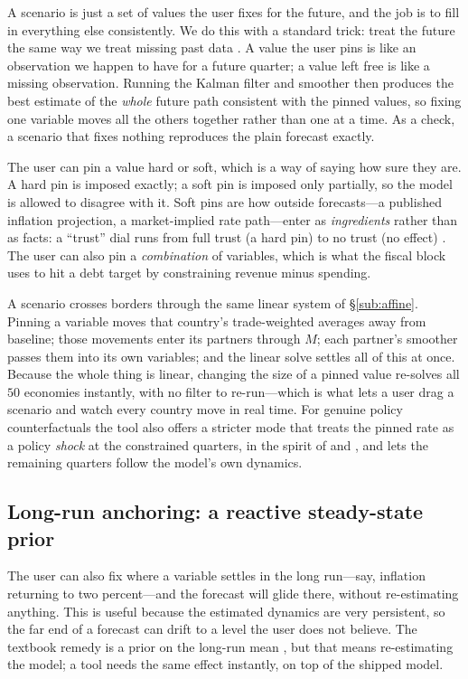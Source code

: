 \documentclass[11pt]{article}
\begin{document}
A scenario is just a set of values the user fixes for the future, and the job is to fill in everything
else consistently. We do this with a standard trick: treat the future the same way we treat missing past
data \citep{DurbinKoopman2012,BanburaGiannoneLenza2015}. A value the user pins is like an observation we
happen to have for a future quarter; a value left free is like a missing observation. Running the Kalman
filter and smoother then produces the best estimate of the \emph{whole} future path consistent with the
pinned values, so fixing one variable moves all the others together rather than one at a time. As a check,
a scenario that fixes nothing reproduces the plain forecast exactly.

The user can pin a value hard or soft, which is a way of saying how sure they are. A hard pin is imposed
exactly; a soft pin is imposed only partially, so the model is allowed to disagree with it. Soft pins are
how outside forecasts---a published inflation projection, a market-implied rate path---enter as
\emph{ingredients} rather than as facts: a ``trust'' dial runs from full trust (a hard pin) to no trust
(no effect) \citep{RobertsonTallmanWhiteman2005}. The user can also pin a \emph{combination} of variables,
which is what the fiscal block uses to hit a debt target by constraining revenue minus spending.

A scenario crosses borders through the same linear system of \S\ref{sub:affine}. Pinning a variable moves
that country's trade-weighted averages away from baseline; those movements enter its partners through
$M$; each partner's smoother passes them into its own variables; and the linear solve settles all of this
at once. Because the whole thing is linear, changing the size of a pinned value re-solves all $50$
economies instantly, with no filter to re-run---which is what lets a user drag a scenario and watch every
country move in real time. For genuine policy counterfactuals the tool also offers a stricter mode that
treats the pinned rate as a policy \emph{shock} at the constrained quarters, in the spirit of
\citet{WaggonerZha1999} and \citet{AntolinDiazPetrellaRubioRamirez2021}, and lets the remaining quarters
follow the model's own dynamics.

\subsection{Long-run anchoring: a reactive steady-state prior}
\label{sub:anchor}

The user can also fix where a variable settles in the long run---say, inflation returning to two
percent---and the forecast will glide there, without re-estimating anything. This is useful because the
estimated dynamics are very persistent, so the far end of a forecast can drift to a level the user does
not believe. The textbook remedy is a prior on the long-run mean \citep{Villani2009}, but that means
re-estimating the model; a tool needs the same effect instantly, on top of the shipped model.
\end{document}
